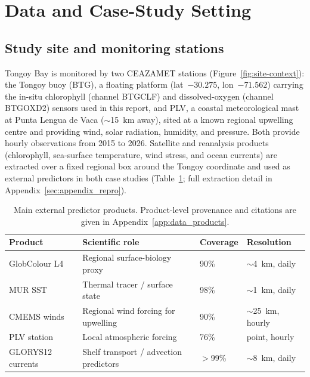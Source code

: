 \section{Data and Case-Study Setting}
\label{sec:data}

\subsection{Study site and monitoring stations}

Tongoy Bay is monitored by two CEAZAMET stations \citep{ceazamet_network,ceazamet_btg_station}
(Figure~\ref{fig:site-context}): the Tongoy buoy
(BTG), a floating platform (lat~$-30.275$\textdegree{}, lon~$-71.562$\textdegree{})
carrying the in-situ chlorophyll (channel BTGCLF) and dissolved-oxygen (channel BTGOXD2) sensors
used in this report, and PLV, a coastal meteorological mast at Punta Lengua de Vaca
($\sim$15~km away), sited at a known regional
upwelling centre \citep{moraga2001plv} and providing wind, solar radiation, humidity, and
pressure. Both provide hourly observations from 2015 to 2026. Satellite and reanalysis products (chlorophyll, sea-surface temperature, wind stress, and
ocean currents) are extracted over a fixed regional box around the Tongoy coordinate and
used as external predictors in both case studies (Table~\ref{tab:data_sources}; full
extraction detail in Appendix~\ref{sec:appendix_repro}).

\begin{table}[htbp]
\centering
\caption{Main external predictor products. Product-level provenance and citations are given in
Appendix~\ref{app:data_products}.}
\label{tab:data_sources}
\small
\begin{tabular}{p{4cm}p{6cm}p{1.6cm}p{2.5cm}}
\toprule
Product & Scientific role & Coverage & Resolution \\
\midrule
GlobColour L4 \chl{} & Regional surface-biology proxy & 90\% & $\sim$4~km, daily \\
MUR SST & Thermal tracer / surface state & 98\% & $\sim$1~km, daily \\
CMEMS winds & Regional wind forcing for upwelling & 90\% & $\sim$25~km, hourly \\
PLV station & Local atmospheric forcing & 76\% & point, hourly \\
GLORYS12 currents & Shelf transport / advection predictors & $>$99\% & $\sim$8~km, daily \\
\bottomrule
\end{tabular}
\end{table}


